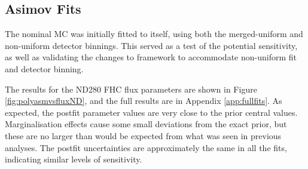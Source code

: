 \subsection{Asimov Fits}

The nominal MC was initially fitted to itself, using both the merged-uniform and non-uniform detector binnings. This served as a test of the potential sensitivity, as well as validating the changes to framework to accommodate non-uniform fit and detector binning. 

The results for the ND280 FHC flux parameters are shown in Figure \ref{fig:polyasmvsfluxND}, and the full results are in Appendix \ref{app:fullfits}. As expected, the postfit parameter values are very close to the prior central values. Marginalisation effects cause some small deviations from the exact prior, but these are no larger than would be expected from what was seen in previous analyses. The postfit uncertainties are approximately the same in all the fits, indicating similar levels of sensitivity.

